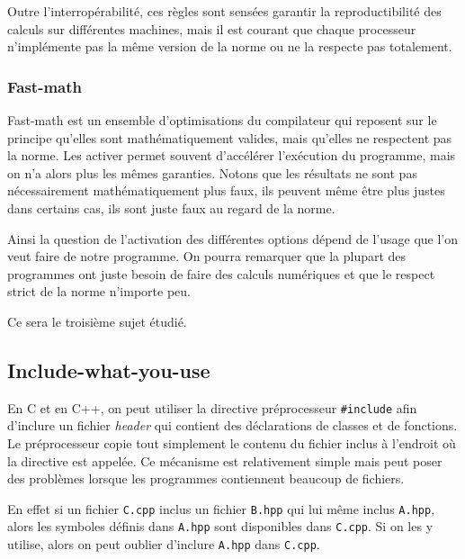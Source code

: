 \documentclass[a4paper,11pt]{report}
\begin{document}
Outre l'interropérabilité, ces règles sont sensées garantir la reproductibilité des calculs sur différentes machines,
mais il est courant que chaque processeur n'implémente pas la même version de la norme ou ne la respecte pas totalement.

\subsubsection{Fast-math}

Fast-math est un ensemble d'optimisations du compilateur qui reposent sur le principe qu'elles sont mathématiquement valides, mais qu'elles ne respectent pas la norme.
Les activer permet souvent d'accélérer l'exécution du programme, mais on n'a alors plus les mêmes garanties.
Notons que les résultats ne sont pas nécessairement mathématiquement plus faux, ils peuvent même être plus justes dans certains cas, ils sont juste faux au regard de la norme.

Ainsi la question de l'activation des différentes options dépend de l'usage que l'on veut faire de notre programme.
On pourra remarquer que la plupart des programmes ont juste besoin de faire des calculs numériques et que le respect strict de la norme n'importe peu.

\bigskip
Ce sera le troisième sujet étudié.

\subsection{Include-what-you-use}
En C et en C++, on peut utiliser la directive préprocesseur \verb'#include' afin d'inclure un fichier \emph{header} qui contient des déclarations de classes et de fonctions.
Le préprocesseur copie tout simplement le contenu du fichier inclus à l'endroit où la directive est appelée.
Ce mécanisme est relativement simple mais peut poser des problèmes lorsque les programmes contiennent beaucoup de fichiers.

En effet si un fichier \verb'C.cpp' inclus un fichier \verb'B.hpp' qui lui même inclus \verb'A.hpp', alors les symboles définis dans \verb'A.hpp' sont disponibles dans \verb'C.cpp'.
Si on les y utilise, alors on peut oublier d'inclure \verb'A.hpp' dans \verb'C.cpp'.
\end{document}
